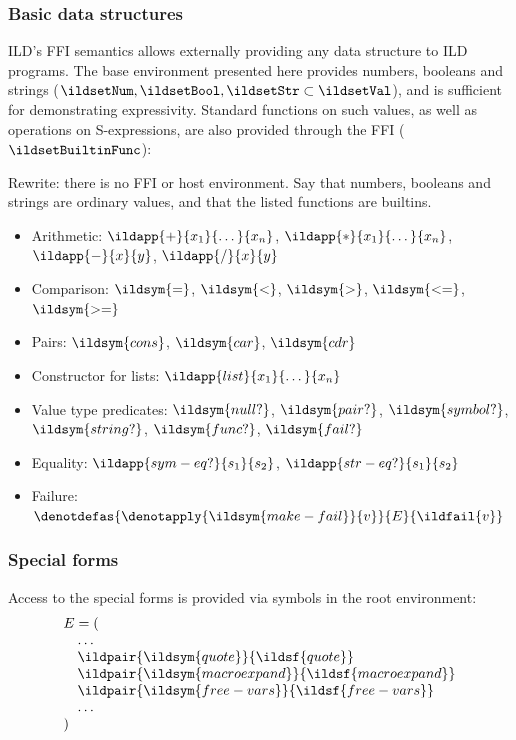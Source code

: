\subsubsection{Basic data structures}
ILD's FFI semantics allows externally providing any data structure to ILD programs.
The base environment presented here provides numbers, booleans and strings
(\(\ildsetNum, \ildsetBool, \ildsetStr \subset \ildsetVal\)), and is sufficient
for demonstrating expressivity. Standard functions on such values, as well as
operations on S-expressions, are also provided through the FFI (\(\ildsetBuiltinFunc\)):
\begin{note}
  Rewrite: there is no FFI or host environment. Say that numbers, booleans and
  strings are ordinary values, and that the listed functions are builtins.
\end{note}
\begin{itemize}
  \item Arithmetic: \(\ildapp{+}{x_1}{\dots}{x_n}\), \(\ildapp{*}{x_1}{\dots}{x_n}\),
    \(\ildapp{-}{x}{y}\), \(\ildapp{/}{x}{y}\)
  \item Comparison: \(\ildsym{=}\), \(\ildsym{<}\),
    \(\ildsym{>}\), \(\ildsym{<=}\), \(\ildsym{>=}\)
  \item Pairs: \(\ildsym{cons}\), \(\ildsym{car}\), \(\ildsym{cdr}\)
  \item Constructor for lists: \(\ildapp{list}{x_1}{\dots}{x_n}\)
  \item Value type predicates: \(\ildsym{null?}\), \(\ildsym{pair?}\),
    \(\ildsym{symbol?}\), \(\ildsym{string?}\), \(\ildsym{func?}\),
    \(\ildsym{fail?}\)
  \item Equality: \(\ildapp{sym-eq?}{s_1}{s_2}\), \(\ildapp{str-eq?}{s_1}{s_2}\)
  \item Failure: \(\denotdefas{\denotapply{\ildsym{make-fail}}{v}}{E}{\ildfail{v}}\)
\end{itemize}

\subsubsection{Special forms}
Access to the special forms is provided via symbols in the root environment:
\begin{equation}
  \begin{array}{@{}l@{}}
    E = ( \\
    \quad \dots \\
    \quad \ildpair{\ildsym{quote}}{\ildsf{quote}} \\
    \quad \ildpair{\ildsym{macroexpand}}{\ildsf{macroexpand}} \\
    \quad \ildpair{\ildsym{free-vars}}{\ildsf{free-vars}} \\
    \quad \dots \\
    )
  \end{array}
\end{equation}

